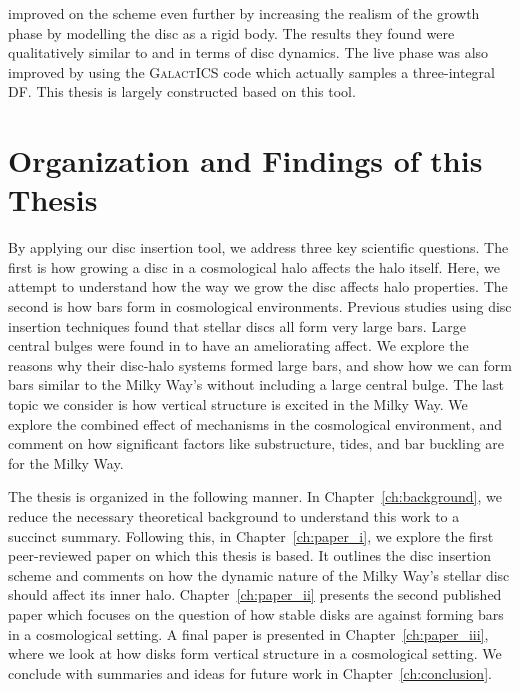 \citet{bauer2018a} improved on the scheme even further by increasing the realism of the growth phase by modelling the disc as a rigid body. The results they found were qualitatively similar to \citet{debuhr_2012} and \citet{ys_2015}  in terms of disc dynamics. The live phase was also improved by using the \textsc{GalactICS} code which actually samples a three-integral DF. This thesis is largely constructed based on this tool.


\section{Organization and Findings of this Thesis}

By applying our disc insertion tool, we address three key scientific questions. The first is how growing a disc in a cosmological halo affects the halo itself. Here, we attempt to understand how the way we grow the disc affects halo properties. The second is how bars form in cosmological environments. Previous studies using disc insertion techniques found that stellar discs all form very large bars. Large central bulges were found in \citet{ys_2015} to have an ameliorating affect. We explore the reasons why their disc-halo systems formed large bars, and show how we can form bars similar to the Milky Way's without including a large central bulge. The last topic we consider is how vertical structure is excited in the Milky Way. We explore the combined effect of mechanisms in the cosmological environment, and comment on how significant factors like substructure, tides, and bar buckling are for the Milky Way.

The thesis is organized in the following manner. In Chapter~\ref{ch:background}, we reduce the necessary theoretical background to understand this work to a succinct summary. Following this, in Chapter~\ref{ch:paper_i}, we explore the first peer-reviewed paper on which this thesis is based. It outlines the disc insertion scheme and comments on how the dynamic nature of the Milky Way's stellar disc should affect its inner halo. Chapter~\ref{ch:paper_ii} presents the second published paper which focuses on the question of how stable disks are against forming bars in a cosmological setting. A final paper is presented in Chapter~\ref{ch:paper_iii}, where we look at how disks form vertical structure in a cosmological setting. We conclude with summaries and ideas for future work in Chapter~\ref{ch:conclusion}.



